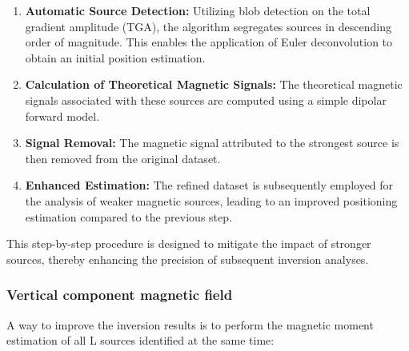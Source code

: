 \begin{enumerate}
  \item \textbf{Automatic Source Detection:} Utilizing blob detection on the total gradient amplitude (TGA), the algorithm segregates sources in descending order of magnitude. This enables the application of Euler deconvolution to obtain an initial position estimation.
  
  \item \textbf{Calculation of Theoretical Magnetic Signals:} The theoretical magnetic signals associated with these sources are computed using a simple dipolar forward model.
  
  \item \textbf{Signal Removal:} The magnetic signal attributed to the strongest source is then removed from the original dataset.
  
  \item \textbf{Enhanced Estimation:} The refined dataset is subsequently employed for the analysis of weaker magnetic sources, leading to an improved positioning estimation compared to the previous step.
\end{enumerate}

This step-by-step procedure is designed to mitigate the impact of stronger sources, thereby enhancing the precision of subsequent inversion analyses.



\subsubsection{Vertical component magnetic field}
A way to improve the inversion results is to perform the magnetic moment estimation of all L sources identified at the same time: 

